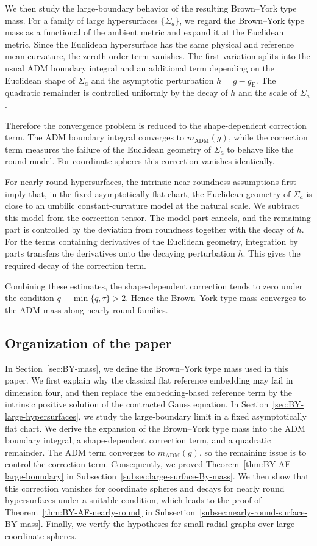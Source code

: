 \documentclass[10pt,a4paper]{amsart}
\newcommand{\gE}{g_{\mathrm{E}}}
\newcommand{\ADM}{\mathrm{ADM}}
\begin{document}
	We then study the large-boundary behavior of the resulting Brown--York type
	mass. For a family of large hypersurfaces $\{\Sigma_a\}$, we regard the
	Brown--York type mass as a functional of the ambient metric and expand it at
	the Euclidean metric. Since the Euclidean hypersurface has the same physical
	and reference mean curvature, the zeroth-order term vanishes. The first
	variation splits into the usual ADM boundary integral and an additional term
	depending on the Euclidean shape of $\Sigma_a$ and the asymptotic perturbation
	$h=g-\gE$. The quadratic remainder is controlled uniformly by the decay of $h$
	and the scale of $\Sigma_a$.
	
	Therefore the convergence problem is reduced to the shape-dependent correction
	term. The ADM boundary integral converges to $m_{\ADM}(g)$, while the correction
	term measures the failure of the Euclidean geometry of $\Sigma_a$ to behave like
	the round model. For coordinate spheres this correction vanishes identically.
	
	For nearly round hypersurfaces, the intrinsic near-roundness assumptions first
	imply that, in the fixed asymptotically flat chart, the Euclidean geometry of
	$\Sigma_a$ is close to an umbilic constant-curvature model at the natural
	scale. We subtract this model from the correction tensor. The model part
	cancels, and the remaining part is controlled by the deviation from roundness
	together with the decay of $h$. For the terms containing derivatives of the
	Euclidean geometry, integration by parts transfers the derivatives onto the
	decaying perturbation $h$. This gives the required decay of the correction
	term.
	
	Combining these estimates, the shape-dependent correction tends to zero under
	the condition $q+\min\{q,\tau\}>2$. Hence the Brown--York type mass converges
	to the ADM mass along nearly round families.
	
	\subsection{Organization of the paper}
	
	In Section~\ref{sec:BY-mass}, we define the Brown--York type mass used in this paper. We first explain why the classical flat reference embedding may fail in dimension four, and then replace the embedding-based reference term by the intrinsic positive solution of the contracted Gauss equation. In Section~\ref{sec:BY-large-hypersurfaces}, we study the large-boundary limit in a fixed asymptotically flat chart. We derive the expansion of the Brown--York type mass into the ADM boundary integral, a shape-dependent correction term, and a quadratic remainder. The ADM term converges to $m_{\ADM}(g)$, so the remaining issue is to control the correction term. Consequently, we proved Theorem~\ref{thm:BY-AF-large-boundary} in Subsection~\ref{subsec:large-surface-By-mass}. We then show that this correction vanishes for coordinate spheres and decays for nearly round hypersurfaces under a suitable condition, which leads to the proof of Theorem~\ref{thm:BY-AF-nearly-round} in Subsection~\ref{subsec:nearly-round-surface-BY-mass}. Finally, we verify the hypotheses for small radial graphs over large coordinate spheres.
	
\end{document}
